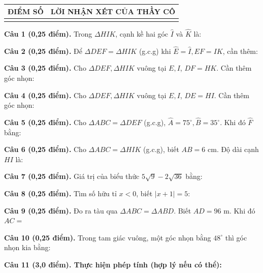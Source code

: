 \documentclass[12pt,a4paper]{article}
\begin{document}
\vspace{1.0mm}

\noindent
\begin{tabularx}{\linewidth}{|p{3.2cm}|X|}
\hline
\centering\textbf{ĐIỂM SỐ} & \centering\textbf{LỜI NHẬN XÉT CỦA THẦY CÔ} \tabularnewline
\hline
\rule{0pt}{1.8cm} & \tabularnewline
\hline
\end{tabularx}

\vspace{1.2mm}
\noindent\textbf{Câu 1 (0,25 điểm).} Trong $\Delta HIK$, cạnh kề hai góc $\widehat{I}$ và $\widehat{K}$ là: \par\vspace{3.0mm}
\noindent\textbf{Câu 2 (0,25 điểm).} Để $\Delta DEF = \Delta HIK$ (g.c.g) khi $\widehat{E}=\widehat{I}, EF=IK$, cần thêm: \par\vspace{3.0mm}
\noindent\textbf{Câu 3 (0,25 điểm).} Cho $\Delta DEF, \Delta HIK$ vuông tại $E, I$, $DF=HK$. Cần thêm góc nhọn: \par\vspace{3.0mm}
\noindent\textbf{Câu 4 (0,25 điểm).} Cho $\Delta DEF, \Delta HIK$ vuông tại $E, I$, $DE=HI$. Cần thêm góc nhọn: \par\vspace{3.0mm}
\noindent\textbf{Câu 5 (0,25 điểm).} Cho $\Delta ABC = \Delta DEF$ (g.c.g), $\widehat{A}=75^\circ, \widehat{B}=35^\circ$. Khi đó $\widehat{F}$ bằng: \par\vspace{3.0mm}
\noindent\textbf{Câu 6 (0,25 điểm).} Cho $\Delta ABC = \Delta HIK$ (g.c.g), biết $AB = 6\text{ cm}$. Độ dài cạnh $HI$ là: \par\vspace{3.0mm}
\noindent\textbf{Câu 7 (0,25 điểm).} Giá trị của biểu thức $5\sqrt{9} - 2\sqrt{36}$ bằng: \par\vspace{3.0mm}
\noindent\textbf{Câu 8 (0,25 điểm).} Tìm số hữu tỉ $x < 0$, biết $|x + 1| = 5$: \par\vspace{3.0mm}
\noindent\textbf{Câu 9 (0,25 điểm).} Đo ra tàu qua $\Delta ABC = \Delta ABD$. Biết $AD = 96\text{ m}$. Khi đó $AC = $ \par\vspace{3.0mm}
\noindent\textbf{Câu 10 (0,25 điểm).} Trong tam giác vuông, một góc nhọn bằng $48^\circ$ thì góc nhọn kia bằng: \par\vspace{3.0mm}
\vspace{0.2mm}
\noindent\textbf{Câu 11 (3,0 điểm). Thực hiện phép tính (hợp lý nếu có thể):}
\vspace{0.6mm}
\end{document}

